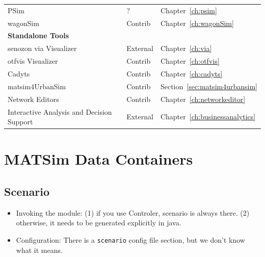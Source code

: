 \begin{center}
\begin{longtable}{|l|l|l|}
	PSim & ? & Chapter~\ref{ch:psim} \\
	wagonSim & Contrib & Chapter~\ref{ch:wagonSim} \\
	\hline
	\textbf{Standalone Tools} & &\\ %
	\hline
	\gls{senozon} \gls{via} Visualizer & External & Chapter~\ref{ch:via} \\
	\gls{otfvis} Visualizer & Contrib & Chapter~\ref{ch:otfvis} \\
	Cadyts & Contrib & Chapter~\ref{ch:cadyts} \\
	\gls{matsim}4UrbanSim & Contrib & Section~\ref{sec:matsim4urbansim} \\	
	Network Editors & Contrib &  Chapter~\ref{ch:networkeditor} \\
	Interactive Analysis and Decision Support & External & Chapter~\ref{ch:businessanalytics} \\
\end{longtable}
\end{center}

\section{MATSim Data Containers}
\label{sec:extending-data-containers}
\subsection{Scenario}
\label{sec:extending-scenario}

\begin{itemize}\styleItemize
\item Invoking the module: (1) if you use Controler, scenario is always there. (2) otherwise, it needs to be generated explicitly in java.  

\item Configuration: There is a \lstinline|scenario| config file section, but we don't know what it means.  
\end{itemize}

